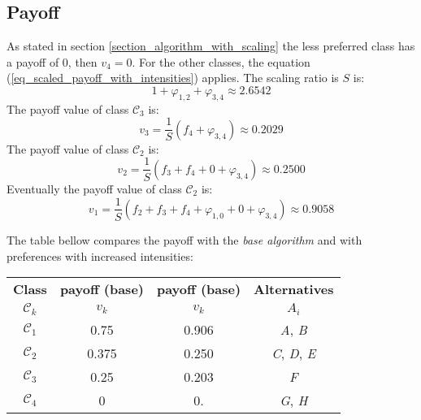 \documentclass[12pt,a4paper]{article}
\begin{document}
\subsection{Payoff}

As stated in section \ref{section_algorithm_with_scaling} the less preferred class has a payoff of 0, then $v_4=0$. For the other classes, the equation (\ref{eq_scaled_payoff_with_intensities}) applies. The scaling ratio is $S$ is:
\begin{equation}
1 + \varphi_{1,2} + \varphi_{3,4} \approx 2.6542
\end{equation}
The payoff value of class $\mathcal{C}_3$ is:
\begin{equation}
v_3 = \frac1S \left( f_4 + \varphi_{3,4} \right) \approx 0.2029
\end{equation}
The payoff value of class $\mathcal{C}_2$ is:
\begin{equation}
v_2 = \frac1S \left( f_3 + f_4 + 0 + \varphi_{3,4}  \right)\approx 0.2500
\end{equation}
Eventually the payoff value of class $\mathcal{C}_2$ is:
\begin{equation}
v_1 = \frac1S \left(f_2 + f_3 + f_4 + \varphi_{1,0} + 0 + \varphi_{3,4}  \right)\approx 0.9058
\end{equation}

The table bellow compares the payoff with the \textsl{base algorithm} and with preferences with increased intensities:

\begin{table}[ht]
\centering
\begin{tabular}{|c|c|c|c|}
\hline
\textbf{Class}&\textbf{payoff (base)}&\textbf{payoff (base)} &\textbf{Alternatives}\\
$\mathcal{C}_k$ & $v_k$ & $v_k$ & $A_i$ \\
\hline
$\mathcal{C}_1$ & 0.75 & 0.906 & \textit{A}, \textit{B} \\
$\mathcal{C}_2$ & 0.375 & 0.250 & \textit{C}, \textit{D}, \textit{E} \\
$\mathcal{C}_3$ & 0.25 & 0.203 & \textit{F} \\
$\mathcal{C}_4$ & 0 & 0. & \textit{G}, \textit{H} \\
\hline
\end{tabular}
\end{table}
\end{document}

